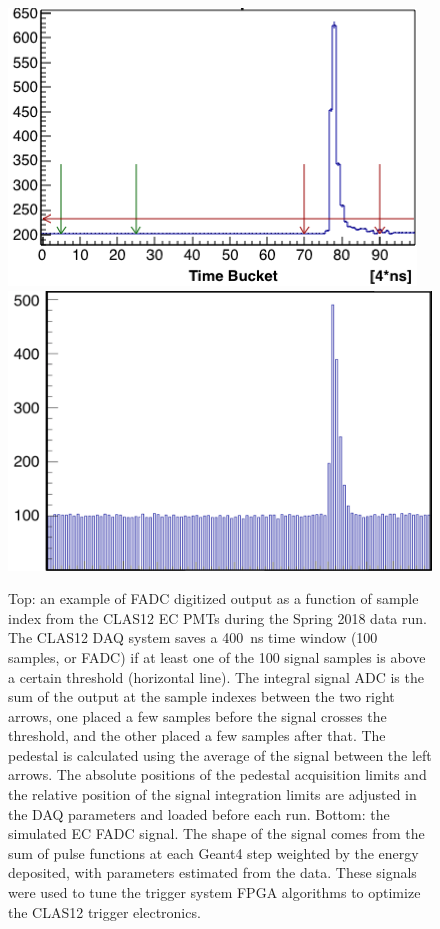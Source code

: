\begin{figure}
	\centering
	\includegraphics[width=1.00\columnwidth, keepaspectratio]{img/fadcData.png}
    \includegraphics[width=0.99\columnwidth, keepaspectratio]{img/fadcGEMC.png}
	\caption{Top: an example of FADC digitized output as a function of sample index from the CLAS12 EC PMTs
    during the Spring 2018 data run.
    The CLAS12 DAQ system saves a 400~ns time window (100 samples, or FADC) if at least one of the 100 signal samples is
    above a certain threshold (horizontal line). The integral signal ADC is the sum of the output at the sample indexes
    between the two right arrows, one placed a few samples before the signal crosses the threshold, and the other placed
    a few samples after that. The pedestal is calculated using the average of the signal between the left arrows. The
    absolute positions of the pedestal acquisition limits and the relative position of the signal integration
    limits are adjusted in the DAQ parameters and loaded before each run.
    Bottom: the simulated EC FADC signal. The shape of the signal comes from the sum of pulse functions at each Geant4 step
    weighted by the energy deposited, with parameters estimated from the data. These signals were used to tune
    the trigger system FPGA algorithms to optimize the CLAS12 trigger electronics. }
	\label{fig:fadcComparison}
\end{figure}

